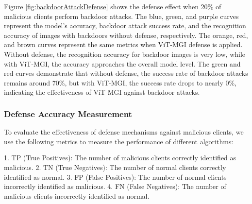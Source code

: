 \documentclass[conference]{IEEEtran}
\begin{document}
Figure \hyperref[fig:backdoorAttackDefense]{\ref{fig:backdoorAttackDefense}} shows the defense effect when 20\% of malicious clients perform backdoor attacks. The blue, green, and purple curves represent the model's accuracy, backdoor attack success rate, and the recognition accuracy of images with backdoors without defense, respectively. The orange, red, and brown curves represent the same metrics when ViT-MGI defense is applied. Without defense, the recognition accuracy for backdoor images is very low, while with ViT-MGI, the accuracy approaches the overall model level. The green and red curves demonstrate that without defense, the success rate of backdoor attacks remains around 70\%, but with ViT-MGI, the success rate drops to nearly 0\%, indicating the effectiveness of ViT-MGI against backdoor attacks.

\subsubsection{\textbf{Defense Accuracy Measurement}}
\label{exp:defense_accuracy}


To evaluate the effectiveness of defense mechanisms against malicious clients, we use the following metrics to measure the performance of different algorithms:


1. TP (True Positives): The number of malicious clients correctly identified as malicious.
2. TN (True Negatives): The number of normal clients correctly identified as normal.
3. FP (False Positives): The number of normal clients incorrectly identified as malicious.
4. FN (False Negatives): The number of malicious clients incorrectly identified as normal.


\end{document}
